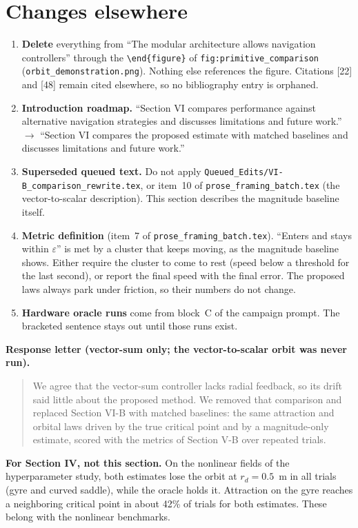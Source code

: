 \documentclass[10pt]{article}
\begin{document}
\section*{Changes elsewhere}
\begin{enumerate}
\item \textbf{Delete} everything from ``The modular architecture allows navigation controllers'' through the \verb|\end{figure}| of \texttt{fig:primitive\_comparison} (\texttt{orbit\_demonstration.png}). Nothing else references the figure. Citations [22] and [48] remain cited elsewhere, so no bibliography entry is orphaned.
\item \textbf{Introduction roadmap.} ``Section VI compares performance against alternative navigation strategies and discusses limitations and future work.'' $\to$ ``Section VI compares the proposed estimate with matched baselines and discusses limitations and future work.''
\item \textbf{Superseded queued text.} Do not apply \texttt{Queued\_Edits/VI-B\_comparison\_rewrite.tex}, or item~10 of \texttt{prose\_framing\_batch.tex} (the vector-to-scalar description). This section describes the magnitude baseline itself.
\item \textbf{Metric definition} (item~7 of \texttt{prose\_framing\_batch.tex}). ``Enters and stays within $\varepsilon$'' is met by a cluster that keeps moving, as the magnitude baseline shows. Either require the cluster to come to rest (speed below a threshold for the last second), or report the final speed with the final error. The proposed laws always park under friction, so their numbers do not change.
\item \textbf{Hardware oracle runs} come from block~C of the campaign prompt. The bracketed sentence stays out until those runs exist.
\end{enumerate}

\textbf{Response letter (vector-sum only; the vector-to-scalar orbit was never run).}
\begin{quote}
We agree that the vector-sum controller lacks radial feedback, so its drift said little about the proposed method. We removed that comparison and replaced Section VI-B with matched baselines: the same attraction and orbital laws driven by the true critical point and by a magnitude-only estimate, scored with the metrics of Section V-B over repeated trials.
\end{quote}

\textbf{For Section IV, not this section.} On the nonlinear fields of the hyperparameter study, both estimates lose the orbit at $r_d = 0.5$~m in all trials (gyre and curved saddle), while the oracle holds it. Attraction on the gyre reaches a neighboring critical point in about 42\% of trials for both estimates. These belong with the nonlinear benchmarks.
\end{document}
